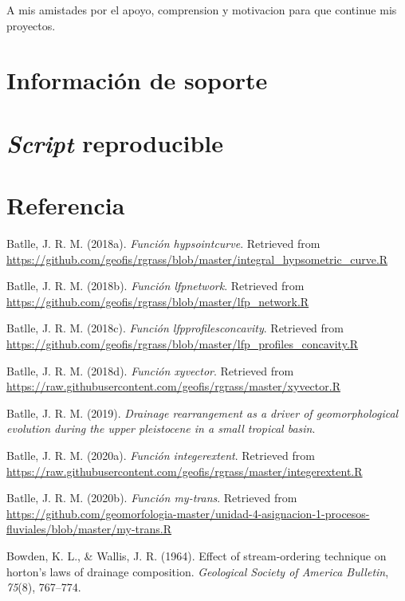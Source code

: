 \documentclass[11pt,]{article}
\begin{document}
A mis amistades por el apoyo, comprension y motivacion para que continue
mis proyectos.

\section{Información de soporte}\label{informaciuxf3n-de-soporte}

\section{\texorpdfstring{\emph{Script}
reproducible}{Script reproducible}}\label{script-reproducible}

\section*{Referencia}\label{referencia}

\hypertarget{refs}{}
\hypertarget{ref-Hypsocjose}{}
Batlle, J. R. M. (2018a). \emph{Función hypsointcurve}. Retrieved from
\url{https://github.com/geofis/rgrass/blob/master/integral_hypsometric_curve.R}

\hypertarget{ref-lfpnetjose}{}
Batlle, J. R. M. (2018b). \emph{Función lfpnetwork}. Retrieved from
\url{https://github.com/geofis/rgrass/blob/master/lfp_network.R}

\hypertarget{ref-lfpconcajose}{}
Batlle, J. R. M. (2018c). \emph{Función lfpprofilesconcavity}. Retrieved
from
\url{https://github.com/geofis/rgrass/blob/master/lfp_profiles_concavity.R}

\hypertarget{ref-xyvector}{}
Batlle, J. R. M. (2018d). \emph{Función xyvector}. Retrieved from
\url{https://raw.githubusercontent.com/geofis/rgrass/master/xyvector.R}

\hypertarget{ref-batlle2019drainage}{}
Batlle, J. R. M. (2019). \emph{Drainage rearrangement as a driver of
geomorphological evolution during the upper pleistocene in a small
tropical basin}.

\hypertarget{ref-intext}{}
Batlle, J. R. M. (2020a). \emph{Función integerextent}. Retrieved from
\url{https://raw.githubusercontent.com/geofis/rgrass/master/integerextent.R}

\hypertarget{ref-Mytransjose}{}
Batlle, J. R. M. (2020b). \emph{Función my-trans}. Retrieved from
\url{https://github.com/geomorfologia-master/unidad-4-asignacion-1-procesos-fluviales/blob/master/my-trans.R}

\hypertarget{ref-bowden1964effect}{}
Bowden, K. L., \& Wallis, J. R. (1964). Effect of stream-ordering
technique on horton's laws of drainage composition. \emph{Geological
Society of America Bulletin}, \emph{75}(8), 767--774.
\end{document}
